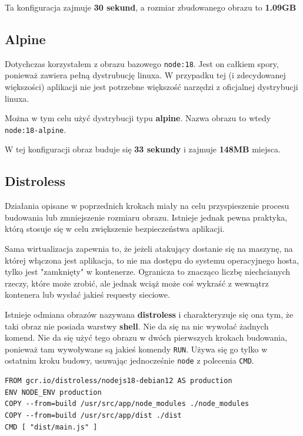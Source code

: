 \documentclass{article}
\begin{document}
Ta konfiguracja zajmuje \textbf{30 sekund}, a rozmiar zbudowanego obrazu to \textbf{1.09GB}

\subsection{Alpine}

Dotychczas korzystałem z obrazu bazowego \lstinline|node:18|. Jest on całkiem spory, ponieważ zawiera pełną dystrubucję linuxa. W przypadku tej (i zdecydowanej większości) aplikacji nie jest potrzebne większość narzędzi z oficjalnej dystrybucji linuxa. 

Można w tym celu użyć dystrybucji typu \textbf{alpine}. Nazwa obrazu to wtedy \lstinline|node:18-alpine|.

W tej konfiguracji obraz buduje się \textbf{33 sekundy} i zajmuje \textbf{148MB} miejsca.

\subsection{Distroless}

Działania opisane w poprzednich krokach miały na celu przyspieszenie procesu budowania lub zmniejszenie rozmiaru obrazu. Istnieje jednak pewna praktyka, którą stosuje się w celu zwiększenie bezpieczeństwa aplikacji.

Sama wirtualizacja zapewnia to, że jeżeli atakujący dostanie się na maszynę, na której włączona jest aplikacja, to nie ma dostępu do systemu operacyjnego hosta, tylko jest "zamknięty" w kontenerze. Ogranicza to znacząco liczbę niechcianych rzeczy, które może zrobić, ale jednak wciąż może coś wykraść z wewnątrz kontenera lub wysłać jakieś requesty sieciowe.

Istnieje odmiana obrazów nazywana \textbf{distroless} i charakteryzuje się ona tym, że taki obraz nie posiada warstwy \textbf{shell}. Nie da się na nic wywołać żadnych komend. Nie da się użyć tego obrazu w dwóch pierwszych krokach budowania, ponieważ tam wywoływane są jakieś komendy \lstinline|RUN|. Używa się go tylko w ostatnim kroku budowy, usuwając jednocześnie \lstinline|node| z polecenia \lstinline|CMD|. 

\begin{lstlisting}[caption=Ostatni etap distroless Dockerfile]
FROM gcr.io/distroless/nodejs18-debian12 AS production
ENV NODE_ENV production
COPY --from=build /usr/src/app/node_modules ./node_modules
COPY --from=build /usr/src/app/dist ./dist
CMD [ "dist/main.js" ]
\end{lstlisting}
\end{document}

